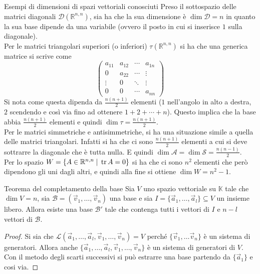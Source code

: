 \begin{Ex}{Esempi di dimensioni di spazi vettoriali conosciuti}
  Preso il sottospazio delle matrici diagonali $\mathscr{D}(\mathbb{R}^{n,n})$, sia ha
  che la sua dimensione è $\dim\mathscr{D}=n$ in quanto la sua base dipende da una
  variabile (ovvero il posto in cui si inserisce $1$ sulla diagonale).\\
  Per le matrici triangolari superiori (o inferiori) $\tau(\mathbb{R}^{n,n})$ si ha che
  una generica matrice si scrive come
  \begin{equation*}
    \begin{pmatrix}
      a_{11} & a_{12} & \cdots & a_{1n}\\
      0 & a_{22} & \cdots & \vdots\\
      \vdots & 0 & \ddots & \vdots\\
      0 & 0 & \cdots & a_{nn}
    \end{pmatrix}
  \end{equation*}
  Si nota come questa dipenda da $\frac{n(n+1)}{2}$ elementi ($1$ nell'angolo in alto a
  destra, $2$ scendendo e così via fino ad ottenere $1+2+\cdots+n$). Questo implica che
  la base abbia $\frac{n(n+1)}{2}$ elementi e quindi $\dim\tau = \frac{n(n+1)}{2}$.\\
  Per le matrici simmetriche e antisimmetriche, si ha una situazione simile a quella
  delle matrici triangolari. Infatti si ha che ci sono $\frac{n(n+1)}{2}$ elementi a cui
  si deve sottrarre la diagonale che è tutta nulla. E quindi
  $\dim\mathscr{A}=\dim\mathscr{S}=\frac{n(n-1)}{2}$.\\
  Per lo spazio $W=\{A\in\mathbb{R}^{n,n}\Setsuchthat \tr A=0\}$ si ha che ci sono $n^2$
  elementi che però dipendono gli uni dagli altri, e quindi alla fine si ottiene $\dim
  W=n^2-1$.
\end{Ex}

\begin{Thm}{Teorema del completamento della base}
  Sia $V$ uno spazio vettoriale su $\mathbb{K}$ tale che $\dim V=n$, sia
  $\mathscr{B}=(\vec{v}_1,\ldots,\vec{v}_n)$ una base e sia
  $I=\{\vec{a}_1,\ldots,\vec{a}_l\}\subseteq V$ un insieme libero. Allora esiste una
  base $\mathscr{B}'$ tale che contenga tutti i vettori di $I$ e $n-l$ vettori di
  $\mathscr{B}$.
\end{Thm}

\begin{proof}
  Si sia che $\mathscr{L}(\vec{a}_1,\ldots,\vec{a}_l,\vec{v}_1,\ldots,\vec{v}_n)=V$
  perché $\{\vec{v}_1,\ldots\vec{v}_n\}$ è un sistema di generatori. Allora anche
  $\{\vec{a}_1,\ldots,\vec{a}_l,\vec{v}_1,\ldots,\vec{v}_n\}$ è un sistema di generatori
  di $V$. Con il metodo degli scarti successivi si può estrarre una base partendo da
  $\{\vec{a}_1\}$ e cosi via.
\end{proof}

